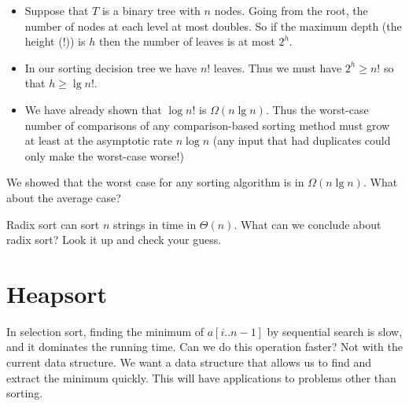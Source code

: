 


\begin{itemize}
\item Suppose that $T$ is a binary tree with $n$ nodes. Going from the root, the
 number of nodes at each level at most doubles. So if the maximum depth (the 
 {height} (!)) is $h$ then the number of leaves is at most $2^h$.
\item In our sorting decision tree we have $n!$ leaves. Thus we must have $2^h 
\geq n!$ so that $h \geq \lg n!$. 
\item We have already shown that $\log n!$ is $\Omega (n \lg n)$. Thus the 
worst-case number of comparisons of any comparison-based sorting method must 
grow at least at the asymptotic rate $n \log n$ (any input that had duplicates 
could only make the worst-case worse!)
\end{itemize}

We showed that the worst case for any sorting algorithm is in $\Omega (n \lg n)$. What about the average case?

\begin{Boxample}[1]
Radix sort can sort $n$ strings in time in $\Theta(n)$.
 What can we conclude about radix sort? Look it up and check your guess.
\end{Boxample}



\chapter{Heapsort} %
\label{sec:heapsort}

In selection sort, finding the minimum of $a[i..n-1]$ by sequential 
search is slow, and it dominates the running time. Can we do this operation 
faster?
Not with the current data structure. 
We want a data structure that allows us to find and extract the minimum quickly. 
This will have applications to problems other than sorting.


